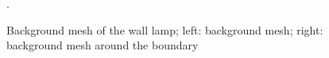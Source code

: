 \begin{figure}[!ht]
    \centering
    \begin{subfigure}[b]{0.49\linewidth}
        \centering
    \end{subfigure}
    \begin{subfigure}[b]{0.49\linewidth}
        \centering
    \end{subfigure}
    \caption[Background mesh of the wall lamp]{Background mesh of the wall lamp; left: background mesh; right: background mesh around the boundary}.
    \label{oct_ex:lamp_mesh_bg}
\end{figure}
